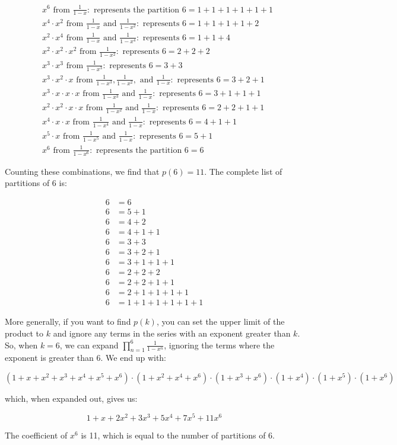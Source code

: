 \documentclass{article}
\theoremstyle{definition}
\begin{document}
\[
\begin{aligned}
&x^6 \text{ from } \frac{1}{1-x}: \text{ represents the partition } 6 = 1+1+1+1+1+1 \\
&x^4 \cdot x^2 \text{ from } \frac{1}{1-x} \text{ and } \frac{1}{1-x^2}: \text{ represents } 6 = 1+1+1+1+2 \\
&x^2 \cdot x^4 \text{ from } \frac{1}{1-x} \text{ and } \frac{1}{1-x^4}: \text{ represents } 6 = 1+1+4 \\
&x^2 \cdot x^2 \cdot x^2 \text{ from } \frac{1}{1-x^2}: \text{ represents } 6 = 2+2+2 \\
&x^3 \cdot x^3 \text{ from } \frac{1}{1-x^3}: \text{ represents } 6 = 3+3 \\
&x^3 \cdot x^2 \cdot x \text{ from } \frac{1}{1-x^3}, \frac{1}{1-x^2}, \text{ and } \frac{1}{1-x}: \text{ represents } 6 = 3+2+1 \\
&x^3 \cdot x \cdot x \cdot x \text{ from } \frac{1}{1-x^3} \text{ and } \frac{1}{1-x}: \text{ represents } 6 = 3+1+1+1 \\
&x^2 \cdot x^2 \cdot x \cdot x \text{ from } \frac{1}{1-x^2} \text{ and } \frac{1}{1-x}: \text{ represents } 6 = 2+2+1+1 \\
&x^4 \cdot x \cdot x \text{ from } \frac{1}{1-x^4} \text{ and } \frac{1}{1-x}: \text{ represents } 6 = 4+1+1 \\
&x^5 \cdot x \text{ from } \frac{1}{1-x^5} \text{ and } \frac{1}{1-x}: \text{ represents } 6 = 5+1 \\
&x^6 \text{ from } \frac{1}{1-x^6}: \text{ represents the partition } 6 = 6
\end{aligned}
\]

\noindent
Counting these combinations, we find that \( p(6) = 11 \). The complete list of partitions of 6 is:

\[
\begin{aligned}
6 &= 6 \\
6 &= 5+1 \\
6 &= 4+2 \\
6 &= 4+1+1 \\
6 &= 3+3 \\
6 &= 3+2+1 \\
6 &= 3+1+1+1 \\
6 &= 2+2+2 \\
6 &= 2+2+1+1 \\
6 &= 2+1+1+1+1 \\
6 &= 1+1+1+1+1+1
\end{aligned}
\]

\noindent
More generally, if you want to find $p(k)$, you can set the upper limit of the product to $k$ and ignore
any terms in the series with an exponent greater than $k$. So, when $k = 6$, we can expand
$\prod_{n=1}^{6} \frac{1}{1-x^n}$, ignoring the terms where the exponent is greater than 6. We end up with:

\[
(1 + x + x^2 + x^3 + x^4 + x^5 + x^6) \cdot (1 + x^2 + x^4 + x^6) \cdot (1 + x^3 + x^6) \cdot (1 + x^4) \cdot 
(1 + x^5) \cdot (1 + x^6)
\]

\noindent
which, when expanded out, gives us:

\[
1 + x + 2x^2 + 3x^3 + 5x^4 + 7x^5 + 11x^6
\]

\noindent
The coefficient of $x^6$ is 11, which is equal to the number of partitions of 6.
\end{document}
